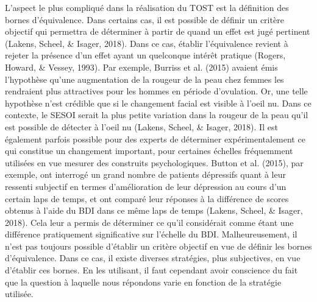 \documentclass[
  12pt,
  french,
]{article}
\begin{document}
L'aspect le plus compliqué dans la réalisation du TOST est la définition
des bornes d'équivalence. Dans certains cas, il est possible de définir
un critère objectif qui permettra de déterminer à partir de quand un
effet est jugé pertinent (Lakens, Scheel, \& Isager, 2018). Dans ce cas,
établir l'équivalence revient à rejeter la présence d'un effet ayant un
quelconque intérêt pratique (Rogers, Howard, \& Vessey, 1993). Par
exemple, Burriss et al. (2015) avaient émis l'hypothèse qu'une
augmentation de la rougeur de la peau chez femmes les rendraient plus
attractives pour les hommes en période d'ovulation. Or, une telle
hypothèse n'est crédible que si le changement facial est visible à
l'oeil nu. Dans ce contexte, le SESOI serait la plus petite variation
dans la rougeur de la peau qu'il est possible de détecter à l'oeil nu
(Lakens, Scheel, \& Isager, 2018). Il est également parfois possible
pour des experts de déterminer expérimentalement ce qui constitue un
changement important, pour certaines échelles fréquemment utilisées en
vue mesurer des construits psychologiques. Button et al. (2015), par
exemple, ont interrogé un grand nombre de patients dépressifs quant à
leur ressenti subjectif en termes d'amélioration de leur dépression au
cours d'un certain laps de temps, et ont comparé leur réponses à la
différence de scores obtenus à l'aide du BDI
dans ce même laps de temps (Lakens, Scheel, \& Isager, 2018). Cela leur
a permis de déterminer ce qu'il considérait comme étant une différence
pratiquement significative sur l'échelle du BDI. Malheureusement, il
n'est pas toujours possible d'établir un critère objectif en vue de
définir les bornes d'équivalence. Dans ce cas, il existe diverses
stratégies, plus subjectives, en vue d'établir ces bornes. En les
utilisant, il faut cependant avoir conscience du fait que la question à
laquelle nous répondons varie en fonction de la stratégie utilisée.
\end{document}
